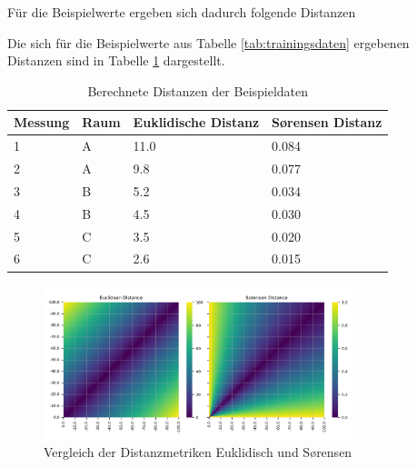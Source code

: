 

Für die Beispielwerte ergeben sich dadurch folgende Distanzen

Die sich für die Beispielwerte aus Tabelle \ref{tab:trainingsdaten} ergebenen Distanzen sind in Tabelle \ref{tab:distanzen} dargestellt.

\begin{table}[h]
    \centering
    \begin{tabularx}{\textwidth}{|X|X|X|X|}
        \hline
        Messung & Raum & Euklidische Distanz & Sørensen Distanz \\ \hline
        1 & A & 11.0 & 0.084 \\ \hline
        2 & A & 9.8 & 0.077 \\ \hline
        3 & B & 5.2 & 0.034 \\ \hline
        4 & B & 4.5 & 0.030 \\ \hline
        5 & C & 3.5 & 0.020 \\ \hline
        6 & C & 2.6 & 0.015 \\ \hline
    \end{tabularx}
    \caption{Berechnete Distanzen der Beispieldaten}
    \label{tab:distanzen}
\end{table}

\begin{figure}[H]
    \centering
    \includegraphics[width=0.8\textwidth]{images/plot_euclidean_vs_sorensen.png}
    \caption{Vergleich der Distanzmetriken Euklidisch und Sørensen}
    \label{fig:distance_metrics_heatmaps}
\end{figure}


